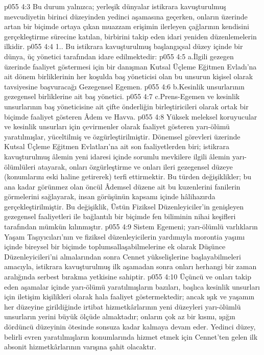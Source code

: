 \vs p055 4:3 Bu durum yalnızca; yerleşik dünyalar istikrara kavuşturulmuş mevcudiyetin birinci düzeyinden yedinci aşamasına geçerken, onların üzerinde artan bir biçimde ortaya çıkan muazzam erişimin ilerleyen çağlarının kendisini gerçekleştirme sürecine katılan, birbirini takip eden idari yeniden düzenlemelerin ilkidir.
\vs p055 4:4 1.. Bu istikrara kavuşturulmuş başlangıçsal düzey içinde bir dünya, üç yönetici tarafından idare edilmektedir:
\vs p055 4:5 a.\bibnobreakspace İlgili gezegen üzerinde faaliyet göstermesi için bir danışman Kutsal Üçleme Eğitmen Evladı’na ait dönem birliklerinin her koşulda baş yöneticisi olan bu unsurun kişisel olarak tavsiyesine başvuracağı Gezegensel Egemen.
\vs p055 4:6 b.\bibnobreakspace Kesinlik unsurlarının gezegensel birliklerine ait baş yönetici.
\vs p055 4:7 c.\bibnobreakspace Prens\hyp{}Egemen ve kesinlik unsurlarının baş yöneticisine ait çifte önderliğin birleştiricileri olarak ortak bir biçimde faaliyet gösteren Âdem ve Havva.
\vs p055 4:8 Yüksek meleksel koruyucular ve kesinlik unsurları için çevirmenler olarak faaliyet gösteren yarı\hyp{}ölümü yaratılmışlar, yüceltilmiş ve özgürleştirilmiştir. Dönemsel görevleri üzerinde Kutsal Üçleme Eğitmen Evlatları’na ait son faaliyetlerden biri; istikrara kavuşturulmuş âlemin yeni idaresi içinde sorumlu mevkilere ilgili âlemin yarı\hyp{}ölümlüleri atayarak, onları özgürleştirme ve onları ileri gezegensel düzeye (konumlarını eski haline getirerek) terfi ettirmektir. Bu türden değişiklikler; bu ana kadar görünmez olan öncül Âdemsel düzene ait bu kuzenlerini fanilerin görmelerini sağlayarak, insan görüşünün kapsamı içinde hâlihazırda gerçekleştirilmiştir. Bu değişiklik, Üstün Fiziksel Düzenleyiciler’in genişleyen gezegensel faaliyetleri ile bağlantılı bir biçimde fen biliminin nihai keşifleri tarafından mümkün kılınmıştır.
\vs p055 4:9 Sistem Egemeni; yarı\hyp{}ölümlü varlıkların Yaşam Taşıyıcıları’nın ve fiziksel düzenleyicilerin yardımıyla morontia yaşımı içinde bireysel bir biçimde toplumsallaşabilmelerine ek olarak Düşünce Düzenleyicileri’ni almalarından sonra Cennet yükselişlerine başlayabilmeleri amacıyla, istikrara kavuşturulmuş ilk aşamadan sonra onları herhangi bir zaman aralığında serbest bırakma yetkisine sahiptir.
\vs p055 4:10 Üçüncü ve onları takip eden aşamalar içinde yarı\hyp{}ölümü yaratılmışların bazıları, başlıca kesinlik unsurları için iletişim kişilikleri olarak hala faaliyet göstermektedir; ancak ışık ve yaşamın her düzeyine girildiğinde irtibat hizmetkârlarının yeni düzeyleri yarı\hyp{}ölümlü unsurların yerini büyük ölçüde almaktadır; onların çok az bir kısmı, ışığın dördüncü düzeyinin ötesinde sonsuza kadar kalmaya devam eder. Yedinci düzey, belirli evren yaratılmışların konumlarında hizmet etmek için Cennet’ten gelen ilk absonit hizmetkârlarının varışına şahit olacaktır.

